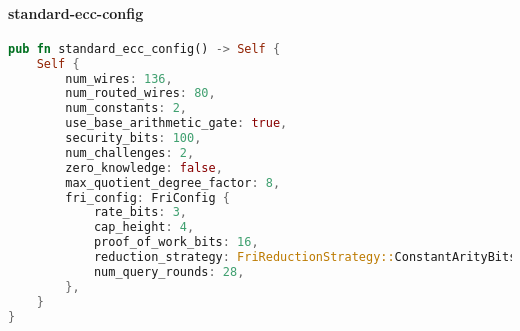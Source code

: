\paragraph{standard-ecc-config}


\begin{lstlisting}[language=rust]
pub fn standard_ecc_config() -> Self {
    Self {
        num_wires: 136,
        num_routed_wires: 80,
        num_constants: 2,
        use_base_arithmetic_gate: true,
        security_bits: 100,
        num_challenges: 2,
        zero_knowledge: false,
        max_quotient_degree_factor: 8,
        fri_config: FriConfig {
            rate_bits: 3,
            cap_height: 4,
            proof_of_work_bits: 16,
            reduction_strategy: FriReductionStrategy::ConstantArityBits(4, 5),
            num_query_rounds: 28,
        },
    }
}   
\end{lstlisting}
